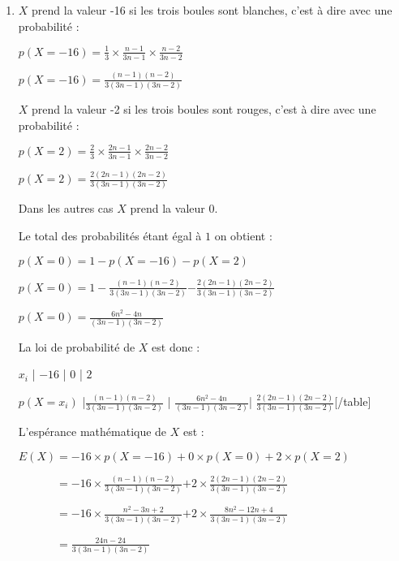 \begin{corrige}
\begin{enumerate}
\begin{itemize}
\begin{itemize}
               \end{itemize}
          \end{itemize}
          \item
          $X$ prend la valeur -16 si les trois boules sont blanches, c'est à dire avec une probabilité :
          \par
          $p(X=-16)=\frac{1}{3} \times \frac{n-1}{3n-1} \times \frac{n-2}{3n-2} $
          \par
          $p(X=-16)=\frac{(n-1)(n-2)}{3(3n-1)(3n-2)}$
          \par
          $X$ prend la valeur -2 si les trois boules sont rouges, c'est à dire avec une probabilité :
          \par
          $p(X=2)=\frac{2}{3} \times \frac{2n-1}{3n-1} \times \frac{2n-2}{3n-2} $
          \par
          $p(X=2)=\frac{2(2n-1)(2n-2)}{3(3n-1)(3n-2)}$
          \par
          Dans les autres cas $X$ prend la valeur $0$.
          \par
          Le total des probabilités étant égal à $1$ on obtient :
          \par
          $p(X=0)=1-p(X=-16)-p(X=2) $
          \par
          $p(X=0)=1-\frac{(n-1)(n-2)}{3(3n-1)(3n-2)}$$-\frac{2(2n-1)(2n-2)}{3(3n-1)(3n-2)}$
          \par
          $p(X=0)=\frac{6n^2-4n}{(3n-1)(3n-2)}$
          \par
          La loi de probabilité de $X$ est donc :
          \par
          [table class=compact]$x_i$ | $-16$ | $0$ | $2$
          \par
          $p(X=x_i)$ |$\frac{(n-1)(n-2)}{3(3n-1)(3n-2)}$ | $\frac{6n^2-4n}{(3n-1)(3n-2)}$| $\frac{2(2n-1)(2n-2)}{3(3n-1)(3n-2)}$[/table]
          \par
          L'espérance mathématique de $X$ est :
          \par
          $E(X)=-16\times p(X=-16)+0 \times p(X=0)+2 \times p(X=2)$
          \par
          $\phantom{E(X)}=-16\times \frac{(n-1)(n-2)}{3(3n-1)(3n-2)}$$+ 2 \times \frac{2(2n-1)(2n-2)}{3(3n-1)(3n-2)}$
          \par
          $\phantom{E(X)}=-16\times \frac{n^2-3n+2}{3(3n-1)(3n-2)}$$+ 2 \times \frac{8n^2-12n+4}{3(3n-1)(3n-2)}$
          \par
          $\phantom{E(X)}=\frac{24n-24}{3(3n-1)(3n-2)}$
$$
\end{enumerate}
\end{corrige}

